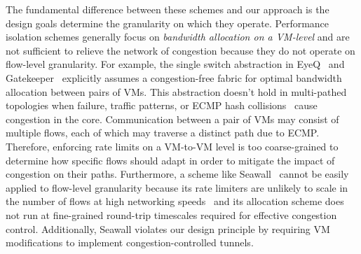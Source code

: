 The fundamental difference between these schemes and our approach is the design
goals determine the granularity on which they operate. 
Performance isolation schemes generally focus on {\em bandwidth allocation on a VM-level} and
are not sufficient to relieve the network of congestion because they do not
operate on flow-level granularity. 
For example, the single switch abstraction
in EyeQ~\cite{jeyakumar2013eyeq} and Gatekeeper~\cite{rodrigues2011gatekeeper} explicitly assumes a congestion-free 
fabric for optimal bandwidth allocation between pairs of VMs. This abstraction doesn't hold in multi-pathed
topologies when failure, traffic patterns, or ECMP hash collisions~\cite{al2010hedera} cause congestion in the core.
Communication between a pair of VMs may consist of
multiple flows, each of which may traverse a distinct path due to ECMP. Therefore,
enforcing rate limits on a VM-to-VM level is too coarse-grained to determine how specific flows should adapt in
order to mitigate the impact of congestion on their paths. Furthermore, a scheme like Seawall~\cite{shieh2011sharing}
cannot be easily applied to flow-level granularity because
its rate limiters are unlikely to scale in the number of flows at high networking speeds~\cite{radhakrishnan2014senic}
and its allocation scheme does not run at fine-grained round-trip
timescales required for effective congestion control. Additionally, Seawall violates our design
principle by requiring VM modifications to implement congestion-controlled tunnels.


